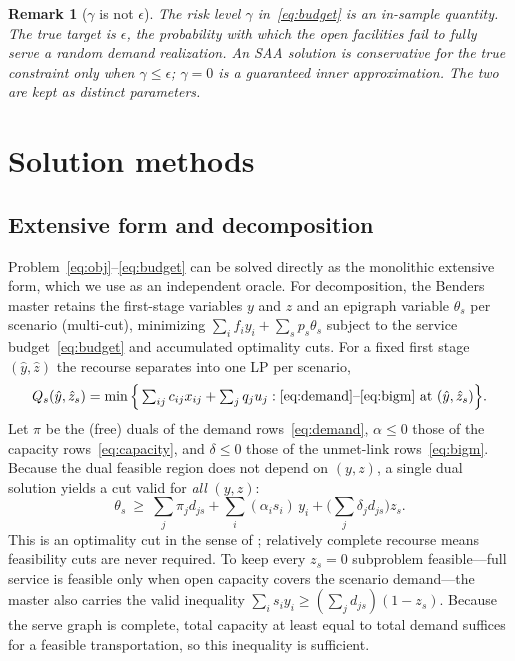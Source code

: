 \documentclass[11pt]{article}
\newtheorem{remark}{Remark}
\begin{document}
\begin{remark}[$\gamma$ is not $\epsilon$]
The risk level $\gamma$ in~\eqref{eq:budget} is an \emph{in-sample} quantity. The
\emph{true} target is $\epsilon$, the probability with which the open facilities
fail to fully serve a random demand realization. An SAA solution is conservative
for the true constraint only when $\gamma\le\epsilon$; $\gamma=0$ is a guaranteed
inner approximation. The two are kept as distinct parameters.
\end{remark}

\section{Solution methods}
\label{sec:methods}

\subsection{Extensive form and decomposition}
Problem~\eqref{eq:obj}--\eqref{eq:budget} can be solved directly as the monolithic
extensive form, which we use as an independent oracle. For decomposition, the
Benders master retains the first-stage variables $y$ and $z$ and an epigraph
variable $\theta_s$ per scenario (multi-cut), minimizing
$\sum_i f_i y_i + \sum_s p_s \theta_s$ subject to the service
budget~\eqref{eq:budget} and accumulated optimality cuts. For a fixed first stage
$(\hat y,\hat z)$ the recourse separates into one LP per scenario,
\begin{equation}
  Q_s(\hat y,\hat z_s) = \min \Big\{ \textstyle\sum_{ij} c_{ij} x_{ij}
    + \sum_j q_j u_j : \eqref{eq:demand}\text{--}\eqref{eq:bigm}
    \text{ at } (\hat y,\hat z_s) \Big\}.
\end{equation}
Let $\pi$ be the (free) duals of the demand rows~\eqref{eq:demand},
$\alpha\le 0$ those of the capacity rows~\eqref{eq:capacity}, and $\delta\le 0$
those of the unmet-link rows~\eqref{eq:bigm}. Because the dual feasible region does
not depend on $(y,z)$, a single dual solution yields a cut valid for \emph{all}
$(y,z)$:
\begin{equation}
  \theta_s \ \ge\ \sum_{j} \pi_j d_{js}
    + \sum_{i} (\alpha_i s_i)\, y_i
    + \Big(\sum_j \delta_j d_{js}\Big) z_s. \label{eq:cut}
\end{equation}
This is an optimality cut in the sense of \citet{vanslyke1969}; relatively complete
recourse means feasibility cuts are never required. To keep every $z_s=0$
subproblem feasible---full service is feasible only when open capacity covers the
scenario demand---the master also carries the valid inequality
$\sum_i s_i y_i \ge (\sum_j d_{js})(1-z_s)$. Because the serve graph is complete,
total capacity at least equal to total demand suffices for a feasible
transportation, so this inequality is sufficient.
\end{document}
